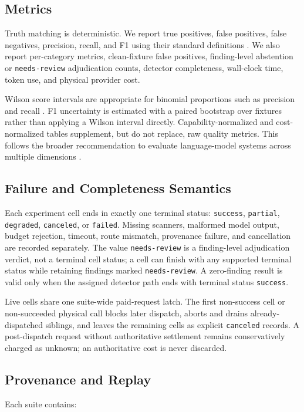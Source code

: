 \documentclass[sigconf,nonacm]{acmart}
\newcommand{\findingstate}[1]{\texttt{#1}}
\begin{document}
\subsection{Metrics}
Truth matching is deterministic. We report true positives, false positives, false negatives, precision, recall, and F1 using their standard definitions \cite{sklearnmetrics}. We also report per-category metrics, clean-fixture false positives, finding-level abstention or \findingstate{needs-review} adjudication counts, detector completeness, wall-clock time, token use, and physical provider cost.

Wilson score intervals are appropriate for binomial proportions such as precision and recall \cite{wilson1927probable}. F1 uncertainty is estimated with a paired bootstrap over fixtures rather than applying a Wilson interval directly. Capability-normalized and cost-normalized tables supplement, but do not replace, raw quality metrics. This follows the broader recommendation to evaluate language-model systems across multiple dimensions \cite{bommasani2023helm}.

\subsection{Failure and Completeness Semantics}
Each experiment cell ends in exactly one terminal status:
\findingstate{success}, \findingstate{partial}, \findingstate{degraded},
\findingstate{canceled}, or \findingstate{failed}. Missing scanners, malformed
model output, budget rejection, timeout, route mismatch, provenance failure,
and cancellation are recorded separately. The value \findingstate{needs-review}
is a finding-level adjudication verdict, not a terminal cell status; a cell can
finish with any supported terminal status while retaining findings marked
\findingstate{needs-review}. A zero-finding result is valid only when the
assigned detector path ends with terminal status \findingstate{success}.

Live cells share one suite-wide paid-request latch. The first non-success cell
or non-succeeded physical call blocks later dispatch, aborts and drains
already-dispatched siblings, and leaves the remaining cells as explicit
\findingstate{canceled} records. A post-dispatch request without authoritative
settlement remains conservatively charged as unknown; an authoritative cost is
never discarded.

\subsection{Provenance and Replay}
Each suite contains:
\end{document}
